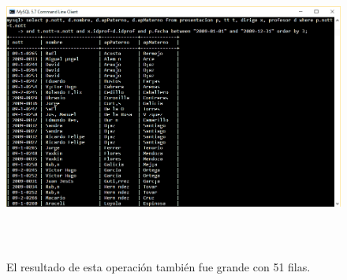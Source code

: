 \documentclass[12pt, titlepage]{article}
\begin{document}
	\begin{figure}[H]
		\begin{center}
			\includegraphics[width=16cm, height=10cm]{img/siete.png}
			\caption{El resultado de esta operación también fue grande con 51 filas.} 
			\label{fig:ejercicio8}
		\end{center}
	\end{figure}
	
\end{document}

